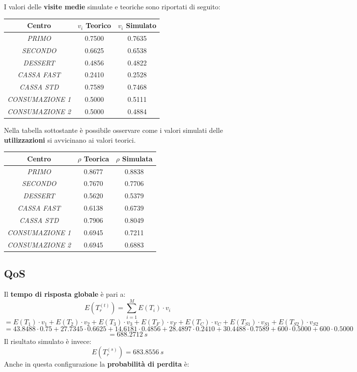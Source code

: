 \documentclass{article}
\begin{document}
I valori delle \textbf{visite medie} simulate e teoriche sono riportati di seguito:
\begin{center}
\begin{tabular}{|c|c|c|}
 \hline
 \textbf{Centro} & $v_i$ \textbf{Teorico} & $v_i$ \textbf{Simulato}\\
 \hline
 \textit{PRIMO} & 0.7500 & 0.7635\\
 \hline
 \textit{SECONDO} & 0.6625 & 0.6538\\
 \hline
 \textit{DESSERT} & 0.4856 & 0.4822\\
 \hline
 \textit{CASSA FAST} & 0.2410 & 0.2528\\
 \hline
 \textit{CASSA STD} & 0.7589 & 0.7468\\
 \hline
 \textit{CONSUMAZIONE 1} & 0.5000 & 0.5111\\
 \hline
 \textit{CONSUMAZIONE 2} & 0.5000 & 0.4884\\
 \hline
\end{tabular}
\end{center}


Nella tabella sottostante è possibile osservare come i valori simulati delle \textbf{utilizzazioni} si avvicinano ai valori teorici.
\begin{center}
\begin{tabular}{|c|c|c|}
 \hline
 \textbf{Centro} & $\rho$ \textbf{Teorica} & $\rho$ \textbf{Simulata}\\
 \hline
 \textit{PRIMO} & 0.8677 & 0.8838\\
 \hline
 \textit{SECONDO} & 0.7670 & 0.7706\\
 \hline
 \textit{DESSERT} & 0.5620 & 0.5379\\
 \hline
 \textit{CASSA FAST} & 0.6138 & 0.6739\\
 \hline
 \textit{CASSA STD} & 0.7906 & 0.8049\\
 \hline
 \textit{CONSUMAZIONE 1} & 0.6945 & 0.7211\\
 \hline
 \textit{CONSUMAZIONE 2} & 0.6945 & 0.6883\\
 \hline
\end{tabular}
\end{center}

\subsection{QoS}
Il \textbf{tempo di risposta globale} è pari a:
\[E(T_{r}^{(t)}) = \sum_{i=1}^{M} E(T_{i}) \cdot v_{i} \]
\[= E(T_1) \cdot v_1+ E(T_2) \cdot v_{2} + E(T_{3}) \cdot v_{3} + E(T_{F}) \cdot v_{F} + E(T_{C}) \cdot v_{C} + E(T_{S1}) \cdot v_{S1} + E(T_{S2}) \cdot v_{S2}\]
\[=  43.8488 \cdot 0.75 + 27.7345 \cdot 0.6625 + 14.6181 \cdot 0.4856 + 28.4897 \cdot 0.2410 + 30.4488 \cdot 0.7589 + 600 \cdot 0.5000 + 600 \cdot 0.5000\]
\[ = 688.2712\ s\]
Il risultato simulato è invece: 
\[E(T_{r}^{(s)}) = 683.8556\ s\]
Anche in questa configurazione la \textbf{probabilità di perdita} è:
\end{document}
